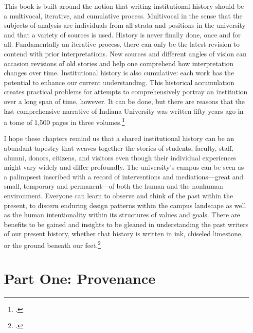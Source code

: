 \documentclass[
  american,
  letterpaper,
]{scrreprt}
\begin{document}
This book is built around the notion that writing institutional history
should be a multivocal, iterative, and cumulative process. Multivocal in
the sense that the subjects of analysis are individuals from all strata
and positions in the university and that a variety of sources is used.
History is never finally done, once and for all. Fundamentally an
iterative process, there can only be the latest revision to contend with
prior interpretations. New sources and different angles of vision can
occasion revisions of old stories and help one comprehend how
interpretation changes over time. Institutional history is also
cumulative: each work has the potential to enhance our current
understanding. This historical accumulation creates practical problems
for attempts to comprehensively portray an institution over a long span
of time, however. It can be done, but there are reasons that the last
comprehensive narrative of Indiana University was written fifty years
ago in a tome of 1,500 pages in three volumes.\footnote{.}

I hope these chapters remind us that a shared institutional history can
be an abundant tapestry that weaves together the stories of students,
faculty, staff, alumni, donors, citizens, and visitors even though their
individual experiences might vary widely and differ profoundly. The
university's campus can be seen as a palimpsest inscribed with a record
of interventions and mediations---great and small, temporary and
permanent---of both the human and the nonhuman environment. Everyone can
learn to observe and think of the past within the present, to discern
enduring design patterns within the campus landscape as well as the
human intentionality within its structures of values and goals. There
are benefits to be gained and insights to be gleaned in understanding
the past writers of our present history, whether that history is written
in ink, chiseled limestone, or the ground beneath our feet.\footnote{.}


\chapter*{Part One: Provenance}\label{sec-partone}

\end{document}
